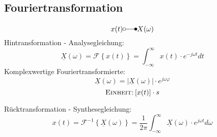 \subsection{Fouriertransformation}
\begin{mdframed}[style=exercise]
    \[
        x(t) \laplace X(\omega)
    \]
    Hintransformation - Analysegleichung:
    \[
        \underline{X}(\omega)=\mathcal{F}\left\{ x(t) \right\} = \int_{-\infty}^{\infty} x(t) \cdot e^{-j\omega t} dt
    \]
    Komplexwertige Fouriertransformierte:
    \[
        \underline{X}(\omega) = |\underline{X}(\omega)|\cdot e^{j\omega\varphi}
    \]
    \footnotesize
    $$\textsc{Einheit:} \left[ x(t) \right]\cdot s$$

    \normalsize

    Rücktransformation - Synthesegleichung:
    \[
        x(t) = \mathcal{F}^{-1}\left\{ \underline{X}(\omega) \right\} = \frac{1}{2\pi}\int_{-\infty}^{\infty} \underline{X}(\omega) \cdot e^{j\omega t} d\omega
    \]
\end{mdframed}


